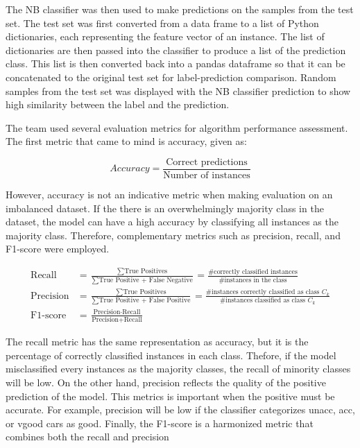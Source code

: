 \documentclass[a4paper]{article}
\begin{document}
The NB classifier was then used to make predictions on the samples from the test set. The test set was first converted from a data frame to a list of Python dictionaries, each representing the feature vector of an instance. The list of dictionaries are then passed into the classifier to produce a list of the prediction class. This list is then converted back into a pandas dataframe so that it can be concatenated to the original test set for label-prediction comparison. Random samples from the test set was displayed with the NB classifier prediction to show high similarity between the label and the prediction.

The team used several evaluation metrics for algorithm performance assessment. The first metric that came to mind is accuracy, given as:

\begin{equation}
  Accuracy = \frac{\text{Correct predictions}}{\text{Number of instances}}
\end{equation}

However, accuracy is not an indicative metric when making evaluation on an imbalanced dataset. If the there is an overwhelmingly majority class in the dataset, the model can have a high accuracy by classifying all instances as the majority class. Therefore, complementary metrics such as precision, recall, and F1-score were employed. 

\begin{subequations}
\begin{align}
  \text{Recall} &= \frac{\sum \text{True Positives}}{\sum \text{True Positive + False Negative}} = \frac{\text{\# correctly classified instances}}{\text{\# instances in the class}} \\
  \text{Precision} &= \frac{\sum \text{True Positives}}{\sum \text{True Positive + False Positive}} = \frac{\text{\# instances correctly classified as class } C_k}{\text{\# instances classified as class } C_k} \\
  \text{F1-score} &= \frac{\text{Precision}\cdot\text{Recall}}{\text{Precision}+\text{Recall}}
\end{align}
\end{subequations}

The recall metric has the same representation as accuracy, but it is the percentage of correctly classified instances in each class. Thefore, if the model misclassified every instances as the majority classes, the recall of minority classes will be low. On the other hand, precision reflects the quality of the positive prediction of the model. This metrics is important when the positive must be accurate. For example, precision will be low if the classifier categorizes unacc, acc, or vgood cars as good. Finally, the F1-score is a harmonized metric that combines both the recall and precision
\end{document}
